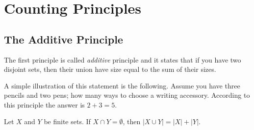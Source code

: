 \chapter{Counting Principles}
\section{The Additive Principle}
The first principle is called \emph{additive} principle and it states that if
you have two disjoint sets, then their union have size equal to the sum of their
sizes.

A simple illustration of this statement is the following. Assume you have three
pencils and two pens; how many ways to choose a writing accessory. According to
this principle the answer is $2 + 3 = 5$.
\begin{theorem}
  Let $X$ and $Y$ be finite sets. If $X \cap Y = \emptyset$, then $|X \cup Y| =
  |X| + |Y|$.
\end{theorem}
